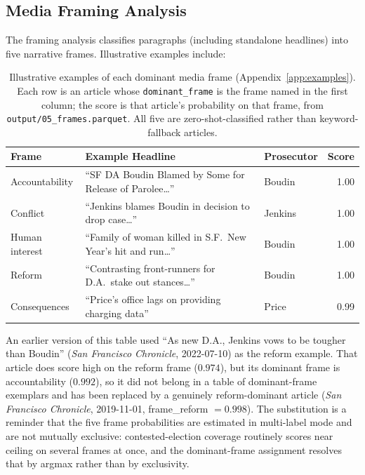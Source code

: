 \documentclass[12pt, letterpaper]{article}
\begin{document}
\begin{appendices}
\subsection*{Media Framing Analysis}

The framing analysis classifies paragraphs (including standalone headlines) into five narrative frames. Illustrative examples include:

\begin{table}[ht]
\centering
\small
\caption{Illustrative examples of each dominant media frame (Appendix~\ref{app:examples}). Each row is an article whose \texttt{dominant\_frame} is the frame named in the first column; the score is that article's probability on that frame, from \texttt{output/05\_frames.parquet}. All five are zero-shot-classified rather than keyword-fallback articles.}
\begin{tabularx}{\textwidth}{lXlr}
\toprule
Frame & Example Headline & Prosecutor & Score \\
\midrule
Accountability & ``SF DA Boudin Blamed by Some for Release of Parolee\ldots'' & Boudin & 1.00 \\
Conflict & ``Jenkins blames Boudin in decision to drop case\ldots'' & Jenkins & 1.00 \\
Human interest & ``Family of woman killed in S.F.\ New Year's hit and run\ldots'' & Boudin & 1.00 \\
Reform & ``Contrasting front-runners for D.A.\ stake out stances\ldots'' & Boudin & 1.00 \\
Consequences & ``Price's office lags on providing charging data'' & Price & 0.99 \\
\bottomrule
\end{tabularx}
\end{table}

An earlier version of this table used ``As new D.A., Jenkins vows to be tougher than Boudin'' (\emph{San Francisco Chronicle}, 2022-07-10) as the reform example. That article does score high on the reform frame ($0.974$), but its dominant frame is accountability ($0.992$), so it did not belong in a table of dominant-frame exemplars and has been replaced by a genuinely reform-dominant article (\emph{San Francisco Chronicle}, 2019-11-01, frame\_reform $= 0.998$). The substitution is a reminder that the five frame probabilities are estimated in multi-label mode and are not mutually exclusive: contested-election coverage routinely scores near ceiling on several frames at once, and the dominant-frame assignment resolves that by argmax rather than by exclusivity.


\end{appendices}
\end{document}
